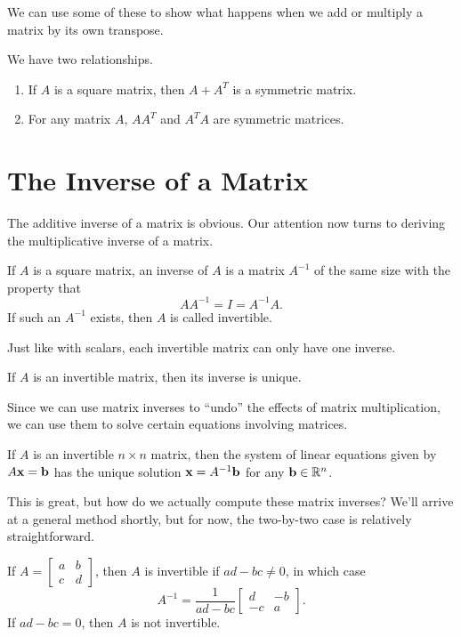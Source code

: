 \documentclass[../m73main.tex]{subfiles}
\begin{document}
We can use some of these to show what happens when we add or multiply a matrix by its own transpose.

\begin{theorem}
	We have two relationships.
	\begin{enumerate}[label=(\alph*)]
		\item If $A$ is a square matrix, then $A + A^T$ is a symmetric matrix.
		\item For any matrix $A$, $AA^T$ and $A^TA$ are symmetric matrices.
	\end{enumerate}
\end{theorem}

\section{The Inverse of a Matrix}
The additive inverse of a matrix is obvious.
Our attention now turns to deriving the multiplicative inverse of a matrix.

\begin{definition}
	If $A$ is a square matrix, an inverse of $A$ is a matrix $A^{-1}$ of the same size with the property that
	\[ A A^{-1} = I = A^{-1} A. \]
	If such an $A^{-1}$ exists, then $A$ is called invertible.
\end{definition}

Just like with scalars, each invertible matrix can only have one inverse.

\begin{theorem}
	If $A$ is an invertible matrix, then its inverse is unique.
\end{theorem}

Since we can use matrix inverses to ``undo'' the effects of matrix multiplication, we can use them to solve certain equations involving matrices.

\begin{theorem}
	If $A$ is an invertible $n\times n$ matrix, then the system of linear equations given by $A\mathbf{x} = \mathbf{b}$ has the unique solution $\mathbf{x} = A^{-1}\mathbf{b}$ for any $\mathbf{b}\in\mathbb{R}^n$.
\end{theorem}

This is great, but how do we actually compute these matrix inverses?
We'll arrive at a general method shortly, but for now, the two-by-two case is relatively straightforward.

\begin{theorem}
	If $A = \begin{bmatrix} a & b \\ c & d \end{bmatrix}$, then $A$ is invertible if $ad - bc \neq 0$, in which case
	\[ A^{-1} = \frac{1}{ad-bc} \begin{bmatrix} d & -b \\ -c & a \end{bmatrix}. \]
	If $ad-bc = 0$, then $A$ is not invertible.
\end{theorem}
\end{document}

